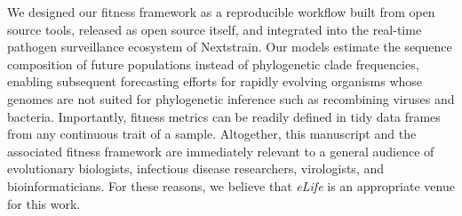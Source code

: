 \documentclass[stdletter,letterpaper,addrfromright,orderfromdateto,dateleft,11pt,noaddrto,sigleft]{newlfm}
\begin{document}
\begin{newlfm}
  We designed our fitness framework as a reproducible workflow built from open source tools, released as open source itself, and integrated into the real-time pathogen surveillance ecosystem of Nextstrain.
  Our models estimate the sequence composition of future populations instead of phylogenetic clade frequencies, enabling subsequent forecasting efforts for rapidly evolving organisms whose genomes are not suited for phylogenetic inference such as recombining viruses and bacteria.
  Importantly, fitness metrics can be readily defined in tidy data frames from any continuous trait of a sample.
  Altogether, this manuscript and the associated fitness framework are immediately relevant to a general audience of evolutionary biologists, infectious disease researchers, virologists, and bioinformaticians.
  For these reasons, we believe that \textit{eLife} is an appropriate venue for this work.
\end{newlfm}
\end{document}

